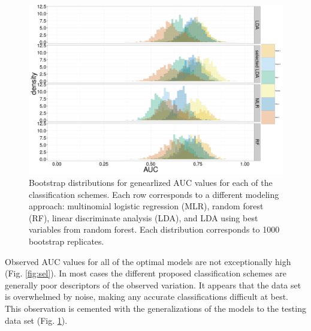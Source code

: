 \documentclass[12pt,letterpaper]{article}
\begin{document}
\begin{figure}[ht]
  \centering
  \includegraphics[height = 0.5\textheight, width = \textwidth, keepaspectratio = true]{figure/gen_res}
  \caption{Bootstrap distributions for genearlized AUC values for each of the classification schemes. Each row corresponds to a different modeling approach: multinomial logistic regression (MLR), random forest (RF), linear discriminate analysis (LDA), and LDA using best variables from random forest. Each distribution corresponds to 1000 bootstrap replicates.}
  \label{fig:gen_hist}
\end{figure}

Observed AUC values for all of the optimal models are not exceptionally high (Fig. \ref{fig:sel}). In most cases the different proposed classification schemes are generally poor descriptors of the observed variation. It appears that the data set is overwhelmed by noise, making any accurate classifications difficult at best. This observation is cemented with the generalizations of the models to the testing data set (Fig. \ref{fig:gen_hist}).
\end{document}
